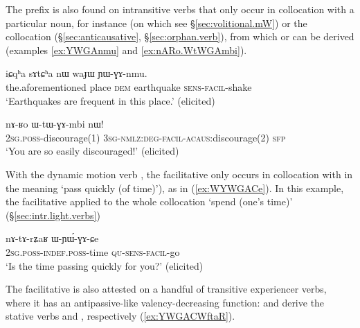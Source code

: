 The  prefix is also found on intransitive verbs that only occur in collocation with a particular noun, for instance  (on which see §\ref{sec:volitional.mW}) or the collocation   (§\ref{sec:anticausative}, §\ref{sec:orphan.verb}), from which  or   can be derived (examples \ref{ex:YWGAnmu} and \ref{ex:nARo.WtWGAmbi}).
 
\begin{exe}
\ex \label{ex:YWGAnmu}
\gll iɕqʰa sɤtɕʰa nɯ waɟɯ ɲɯ-ɣɤ-nmu. \\
the.aforementioned place \textsc{dem} earthquake \textsc{sens}-\textsc{facil}-shake \\
\glt `Earthquakes are frequent in this place.' (elicited)
\end{exe}

\begin{exe}
\ex \label{ex:nARo.WtWGAmbi}
\gll nɤ-ʁo ɯ-tɯ-ɣɤ-mbi nɯ! \\
\textsc{2sg}.\textsc{poss}-discourage(1) \textsc{3sg}-\textsc{nmlz}:\textsc{deg}-\textsc{facil}-\textsc{acaus}:discourage(2) \textsc{sfp} \\
\glt `You are so easily discouraged!' (elicited)
\end{exe}

With the dynamic motion verb , the facilitative  only occurs in collocation with  in the meaning `pass quickly (of time)'), as in (\ref{ex:WYWGACe}). In this example, the facilitative applied to the whole collocation   `spend (one's time)' (§\ref{sec:intr.light.verbs})

\begin{exe}
\ex \label{ex:WYWGACe}
\gll nɤ-tɤ-rʑaʁ ɯ-ɲɯ́-ɣɤ-ɕe \\
\textsc{2sg}.\textsc{poss}-\textsc{indef}.\textsc{poss}-time \textsc{qu}-\textsc{sens}-\textsc{facil}-go \\
\glt `Is the time passing quickly for you?' (elicited)
\end{exe}

 The facilitative  is also attested on a handful of transitive experiencer verbs, where it has an antipassive-like valency-decreasing function:   and  derive the stative verbs   and , respectively (\ref{ex:YWGACWftaR}). 

